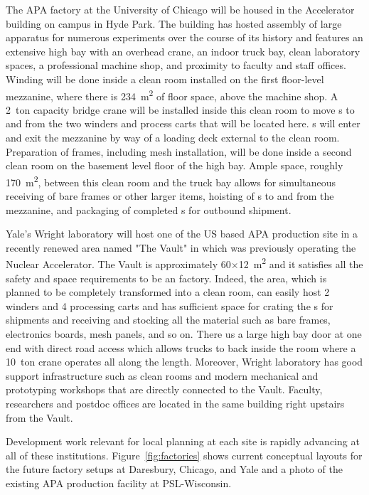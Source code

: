 The APA factory at the University of Chicago will be housed in the Accelerator building on campus in Hyde Park.  The building has hosted assembly of large apparatus for numerous experiments over the course of its history and features an extensive high bay with an overhead crane, an indoor truck bay, clean laboratory spaces, a professional machine shop, and proximity to faculty and staff offices.  Winding will be done inside a clean room installed on the first floor-level mezzanine, where there is \SI{234}{m^2} of floor space, above the machine shop.  A \SI{2}{ton} capacity bridge crane will be installed inside this clean room to move s to and from the two winders and process carts that will be located here.  s will enter and exit the mezzanine by way of a loading deck external to the clean room.  Preparation of  frames, including mesh installation, will be done inside a second clean room on the basement level floor of the high bay.  Ample space, roughly \SI{170}{m^2}, between this clean room and the truck bay allows for simultaneous receiving of bare frames or other larger items, hoisting of s to and from the mezzanine, and packaging of completed s for outbound shipment.

Yale's Wright laboratory will host one of the US based APA production site in a recently renewed area named "The Vault" in which was previously operating the Nuclear Accelerator.  The Vault is approximately 60$\times$\SI{12}{m^2} and it satisfies all the safety and space requirements to be an  factory. 
Indeed, the area, which is planned to be completely transformed into a clean room, can easily host 2 winders and 4 processing carts and has sufficient space for crating the s for shipments and receiving and stocking all the material such as bare frames, electronics boards, mesh panels, and so on. 
There us a large high bay door at one end with direct road access which allows trucks to back inside the room where a \SI{10}{ton} crane operates all along the length.  Moreover, Wright laboratory has good support infrastructure such as clean rooms and modern mechanical and prototyping workshops that are directly connected to the Vault. Faculty, researchers and postdoc offices are located in the same building right upstairs from the Vault.

Development work relevant for local planning at each site is rapidly advancing at all of these institutions.  Figure~\ref{fig:factories} shows current conceptual layouts for the future factory setups at Daresbury, Chicago, and Yale and a photo of the existing APA production facility at PSL-Wisconsin.    
 

